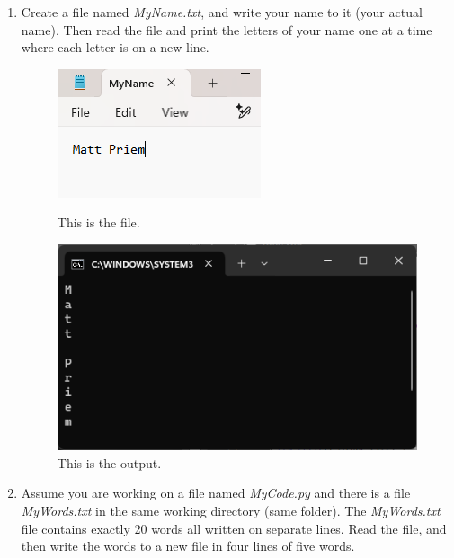 \documentclass{article}
\begin{document}
\begin{enumerate}
	\item
		Create a file named \textit{MyName.txt}, and write your name to it (your actual name).	 
		Then read the file and print the letters of your name one at a time where each letter is on a new line.
		\begin{figure}[ht]
			\centering
			\begin{minipage}[b]{.4\textwidth}
				\centering
				\includegraphics[scale=1]{imgs/nameFile.png}
				\caption{This is the file.}	
			\end{minipage}
			\hspace*{2em}
			\begin{minipage}[b]{.4\textwidth}
				\centering
				\includegraphics[width=1\textwidth]{imgs/nameOutput.png}
				\caption{This is the output.}
			\end{minipage}
		\end{figure}


	\item
		Assume you are working on a file named \textit{MyCode.py} and there is a file \textit{MyWords.txt} in the same 
		working directory (same folder). The \textit{MyWords.txt} file contains exactly 20 words all written on separate
		lines. Read the file, and then write the words to a new file in four lines of five words.







\end{enumerate}
\end{document}
